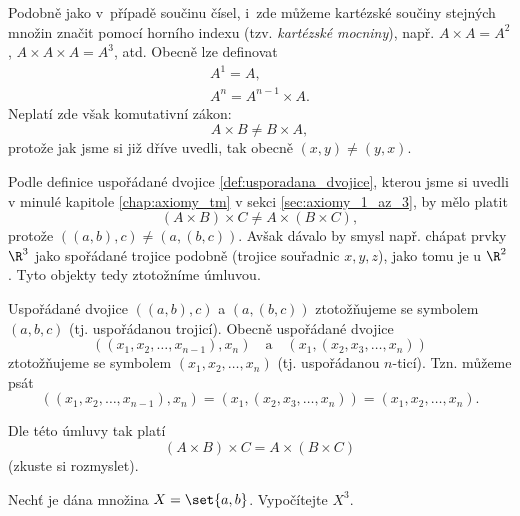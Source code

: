 Podobně jako v~případě součinu čísel, i~zde můžeme kartézské součiny stejných množin značit pomocí horního indexu (tzv. \emph{kartézské mocniny}), např. $A\times A=A^2$, $A\times A\times A=A^3$, atd. Obecně lze definovat
\begin{align*}
    A^1=A,\\
    A^n=A^{n-1}\times A.
\end{align*}
Neplatí zde však komutativní zákon:
\begin{equation*}
    A\times B\neq B\times A,
\end{equation*}
protože jak jsme si již dříve uvedli, tak obecně $(x,y)\neq (y,x)$.\par
Podle definice uspořádané dvojice \ref{def:usporadana_dvojice}, kterou jsme si uvedli v minulé kapitole \ref{chap:axiomy_tm} v sekci \ref{sec:axiomy_1_az_3}, by mělo platit
\begin{equation*}
    (A\times B)\times C\neq A\times (B\times C),
\end{equation*}
protože $((a,b),c)\neq(a,(b,c))$. Avšak dávalo by smysl např. chápat prvky $\R^3$ jako spořádané trojice podobně (trojice souřadnic $x,y,z$), jako tomu je u $\R^2$. Tyto objekty tedy ztotožníme úmluvou.
\begin{convention}\label{conv:usporadana_ntice}
    Uspořádané dvojice $((a,b),c)$ a $(a,(b,c))$ ztotožňujeme se symbolem $(a,b,c)$ (tj. uspořádanou trojicí). Obecně uspořádané dvojice
    \begin{equation*}
        ((x_1,x_2,\dots,x_{n-1}),x_n)\quad\text{a}\quad(x_1,(x_2,x_3,\dots,x_n))
    \end{equation*}
    ztotožňujeme se symbolem $(x_1,x_2,\dots,x_n)$ (tj. uspořádanou $n$-ticí). Tzn. můžeme psát
    \begin{equation*}
        ((x_1,x_2,\dots,x_{n-1}),x_n)=(x_1,(x_2,x_3,\dots,x_n))=(x_1,x_2,\dots,x_n).
    \end{equation*}
\end{convention}
Dle této úmluvy tak platí
\begin{equation*}
    (A\times B)\times C=A\times (B\times C)
\end{equation*}
(zkuste si rozmyslet).
\begin{example}
    Nechť je dána množina $X=\set{a,b}$. Vypočítejte $X^3$.
\end{example}
